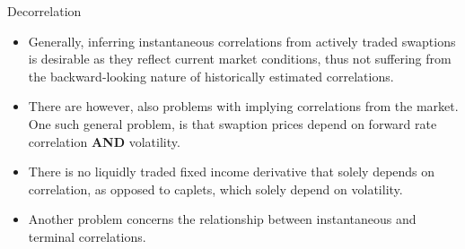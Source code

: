 \documentclass{beamer}
\begin{document}

\begin{frame}{Decorrelation}
\begin{itemize}
	\item<1-> Generally, inferring instantaneous correlations from actively traded swaptions is desirable as they reflect current market conditions, thus not suffering from the backward-looking nature of historically estimated correlations. 
	\item<2-> There are however, also problems with implying correlations from the market. One such general problem, is that swaption prices depend on forward rate correlation \textbf{AND} volatility. 
	\item<3-> There is no liquidly traded fixed income derivative that solely depends on correlation, as opposed to caplets, which solely depend on volatility.
	\item<4-> Another problem concerns the relationship between instantaneous and terminal correlations.
\end{itemize}
\end{frame}	
	 
\end{document}
